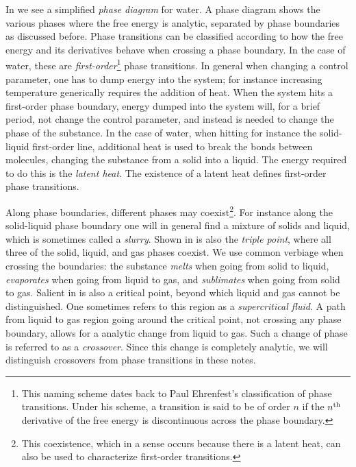 In  we see a simplified {\it phase diagram} for water. A phase diagram shows the various phases where
the free energy is analytic, separated by phase boundaries as discussed before.
Phase transitions can be classified according to how the free energy and its
derivatives behave when crossing a phase boundary. In the case of water, these
are {\it first-order}\footnote{This naming scheme dates back to Paul Ehrenfest's
classification of phase transitions. Under his scheme, a transition is said to
be of order $n$ if the $n{}^{\rm th}$ derivative of the free energy is discontinuous
across the phase boundary.} phase transitions.
In general when changing a control parameter, one has to dump energy into the
system; for instance increasing temperature generically requires the addition of
heat. When the system hits a first-order phase boundary, energy dumped into the
system will, for a brief period, not change the control parameter, and instead
is needed to change the phase of the substance. In the case of water, when
hitting for instance the solid-liquid first-order line, additional heat is used
to break the bonds between molecules, changing the substance from a solid into a
liquid. The energy required to do this is the {\it latent heat}. The existence of a latent heat defines first-order phase transitions.

Along phase boundaries, different phases may coexist\footnote{This
coexistence, which in a sense occurs because there is a latent heat,
can also be used to characterize first-order transitions.}. For instance along the
solid-liquid phase boundary one will in general find a mixture of solids and
liquid, which is sometimes called a {\it slurry}. 
Shown in  is also the {\it triple point}, where all three of the solid, liquid, and gas phases coexist.
We use common verbiage when crossing the boundaries: the substance {\it
melts} when going from solid to liquid, {\it
evaporates} when going
from liquid to gas, and {\it sublimates} when going from solid
to gas. Salient in  is also a critical point, beyond
which liquid and gas cannot be distinguished. One sometimes refers to this
region as a {\it supercritical fluid}. A path from
liquid to gas region going around the critical point, not crossing any phase
boundary, allows for a analytic change from liquid to gas. Such a change of
phase is referred to as a {\it crossover}. Since this change is
completely analytic, we will distinguish crossovers from phase transitions in
these notes. 

